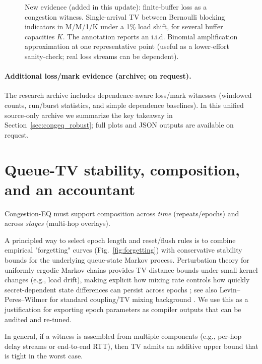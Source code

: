 \documentclass[11pt]{article}
\theoremstyle{definition}
\theoremstyle{remark}
\begin{document}
\begin{figure}[t]
\centering
{}
\caption{New evidence (added in this update): finite-buffer loss as a congestion witness.
Single-arrival TV between Bernoulli blocking indicators in M/M/1/K under a 1\% load shift, for several buffer capacities $K$.
The annotation reports an i.i.d. Binomial amplification approximation at one representative point (useful as a lower-effort sanity-check; real loss streams can be dependent).
}
\label{fig:mm1k}
\end{figure}


\paragraph{Additional loss/mark evidence (archive; on request).}
The research archive includes dependence-aware loss/mark witnesses (windowed counts, run/burst statistics, and simple dependence baselines).
In this unified source-only archive we summarize the key takeaway in Section~\ref{sec:congeq_robust}; full plots and JSON outputs are available on request.

\section{Queue-TV stability, composition, and an accountant}
Congestion-EQ must support composition across \emph{time} (repeats/epochs) and across \emph{stages} (multi-hop overlays).

A principled way to select epoch length and reset/flush rules is to combine empirical "forgetting" curves (Fig.~\ref{fig:forgetting}) with conservative stability bounds for the underlying queue-state Markov process.
Perturbation theory for uniformly ergodic Markov chains provides TV-distance bounds under small kernel changes (e.g., load drift), making explicit how mixing rate controls how quickly secret-dependent state differences can persist across epochs \cite{mitrophanov2005}; see also Levin--Peres--Wilmer for standard coupling/TV mixing background \cite{levin_peres_wilmer}.
We use this as a justification for exporting epoch parameters as compiler outputs that can be audited and re-tuned.

In general, if a witness is assembled from multiple components (e.g., per-hop delay streams or end-to-end RTT), then TV admits an additive upper bound that is tight in the worst case.
\end{document}
